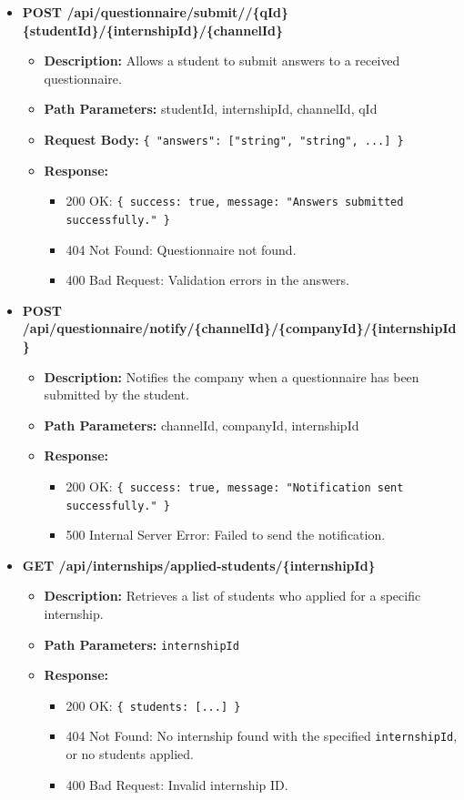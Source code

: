 \begin{itemize}
    \item \textbf{POST /api/questionnaire/submit//\{qId\}\{studentId\}/\{internshipId\}/\{channelId\}}  
    \begin{itemize}
        \item \textbf{Description:} Allows a student to submit answers to a received questionnaire.
        \item \textbf{Path Parameters:} studentId, internshipId, channelId, qId 
        \item \textbf{Request Body:} 
        \texttt{\{ 
            "answers": ["string", "string", ...] 
        \}}
        \item \textbf{Response:}
        \begin{itemize}
            \item 200 OK: \texttt{\{ success: true, message: "Answers submitted successfully." \}}
            \item 404 Not Found: Questionnaire not found.
            \item 400 Bad Request: Validation errors in the answers.
        \end{itemize}
    \end{itemize}

    \item \textbf{POST /api/questionnaire/notify/\{channelId\}/\{companyId\}/\{internshipId\}}  
    \begin{itemize}
        \item \textbf{Description:} Notifies the company when a questionnaire has been submitted by the student.
        \item \textbf{Path Parameters:} channelId, companyId, internshipId  
        \item \textbf{Response:}
        \begin{itemize}
            \item 200 OK: \texttt{\{ success: true, message: "Notification sent successfully." \}}
            \item 500 Internal Server Error: Failed to send the notification.
        \end{itemize}
    \end{itemize}

    \item \textbf{GET /api/internships/applied-students/\{internshipId\}}  
    \begin{itemize}
        \item \textbf{Description:} Retrieves a list of students who applied for a specific internship.
        \item \textbf{Path Parameters:} \texttt{internshipId}
        \item \textbf{Response:}
        \begin{itemize}
            \item 200 OK: \texttt{\{ students: [...] \}}
            \item 404 Not Found: No internship found with the specified \texttt{internshipId}, or no students applied.
            \item 400 Bad Request: Invalid internship ID.
        \end{itemize}
    \end{itemize}



\end{itemize}
